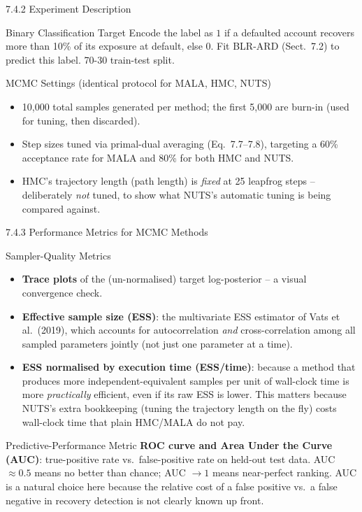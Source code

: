 \documentclass[aspectratio=169,10pt]{beamer}
\begin{document}
\begin{frame}{7.4.2 Experiment Description}

\begin{block}{Binary Classification Target}
Encode the label as $1$ if a defaulted account recovers more than 10\% of its exposure at default, else $0$. Fit BLR-ARD (Sect.~7.2) to predict this label. 70-30 train-test split.
\end{block}

\begin{block}{MCMC Settings (identical protocol for MALA, HMC, NUTS)}
\begin{itemize}
  \item 10{,}000 total samples generated per method; the first 5{,}000 are burn-in (used for tuning, then discarded).
  \item Step sizes tuned via primal-dual averaging (Eq.~7.7--7.8), targeting a 60\% acceptance rate for MALA and 80\% for both HMC and NUTS.
  \item HMC's trajectory length (path length) is \emph{fixed} at 25 leapfrog steps -- deliberately \emph{not} tuned, to show what NUTS's automatic tuning is being compared against.
\end{itemize}
\end{block}
\end{frame}

\begin{frame}{7.4.3 Performance Metrics for MCMC Methods}

\begin{block}{Sampler-Quality Metrics}
\begin{itemize}
  \item \textbf{Trace plots} of the (un-normalised) target log-posterior -- a visual convergence check.
  \item \textbf{Effective sample size (ESS)}: the multivariate ESS estimator of Vats et al.\ (2019), which accounts for autocorrelation \emph{and} cross-correlation among all sampled parameters jointly (not just one parameter at a time).
  \item \textbf{ESS normalised by execution time (ESS/time)}: because a method that produces more independent-equivalent samples per unit of wall-clock time is more \emph{practically} efficient, even if its raw ESS is lower. This matters because NUTS's extra bookkeeping (tuning the trajectory length on the fly) costs wall-clock time that plain HMC/MALA do not pay.
\end{itemize}
\end{block}

\begin{block}{Predictive-Performance Metric}
\textbf{ROC curve and Area Under the Curve (AUC)}: true-positive rate vs.\ false-positive rate on held-out test data. AUC $\approx 0.5$ means no better than chance; AUC $\to 1$ means near-perfect ranking. AUC is a natural choice here because the relative cost of a false positive vs.\ a false negative in recovery detection is not clearly known up front.
\end{block}
\end{frame}
\end{document}
